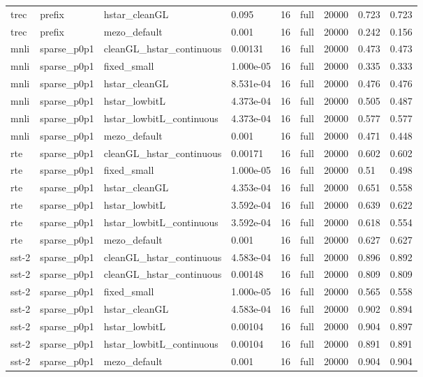 \begin{table}[t]
\begin{tabular}{lllllllll}
trec & prefix & hstar\_cleanGL & 0.095 & 16 & full & 20000 & 0.723 & 0.723 \\
trec & prefix & mezo\_default & 0.001 & 16 & full & 20000 & 0.242 & 0.156 \\
mnli & sparse\_p0p1 & cleanGL\_hstar\_continuous & 0.00131 & 16 & full & 20000 & 0.473 & 0.473 \\
mnli & sparse\_p0p1 & fixed\_small & 1.000e-05 & 16 & full & 20000 & 0.335 & 0.333 \\
mnli & sparse\_p0p1 & hstar\_cleanGL & 8.531e-04 & 16 & full & 20000 & 0.476 & 0.476 \\
mnli & sparse\_p0p1 & hstar\_lowbitL & 4.373e-04 & 16 & full & 20000 & 0.505 & 0.487 \\
mnli & sparse\_p0p1 & hstar\_lowbitL\_continuous & 4.373e-04 & 16 & full & 20000 & 0.577 & 0.577 \\
mnli & sparse\_p0p1 & mezo\_default & 0.001 & 16 & full & 20000 & 0.471 & 0.448 \\
rte & sparse\_p0p1 & cleanGL\_hstar\_continuous & 0.00171 & 16 & full & 20000 & 0.602 & 0.602 \\
rte & sparse\_p0p1 & fixed\_small & 1.000e-05 & 16 & full & 20000 & 0.51 & 0.498 \\
rte & sparse\_p0p1 & hstar\_cleanGL & 4.353e-04 & 16 & full & 20000 & 0.651 & 0.558 \\
rte & sparse\_p0p1 & hstar\_lowbitL & 3.592e-04 & 16 & full & 20000 & 0.639 & 0.622 \\
rte & sparse\_p0p1 & hstar\_lowbitL\_continuous & 3.592e-04 & 16 & full & 20000 & 0.618 & 0.554 \\
rte & sparse\_p0p1 & mezo\_default & 0.001 & 16 & full & 20000 & 0.627 & 0.627 \\
sst-2 & sparse\_p0p1 & cleanGL\_hstar\_continuous & 4.583e-04 & 16 & full & 20000 & 0.896 & 0.892 \\
sst-2 & sparse\_p0p1 & cleanGL\_hstar\_continuous & 0.00148 & 16 & full & 20000 & 0.809 & 0.809 \\
sst-2 & sparse\_p0p1 & fixed\_small & 1.000e-05 & 16 & full & 20000 & 0.565 & 0.558 \\
sst-2 & sparse\_p0p1 & hstar\_cleanGL & 4.583e-04 & 16 & full & 20000 & 0.902 & 0.894 \\
sst-2 & sparse\_p0p1 & hstar\_lowbitL & 0.00104 & 16 & full & 20000 & 0.904 & 0.897 \\
sst-2 & sparse\_p0p1 & hstar\_lowbitL\_continuous & 0.00104 & 16 & full & 20000 & 0.891 & 0.891 \\
sst-2 & sparse\_p0p1 & mezo\_default & 0.001 & 16 & full & 20000 & 0.904 & 0.904 \\

\end{tabular}
\end{table}
